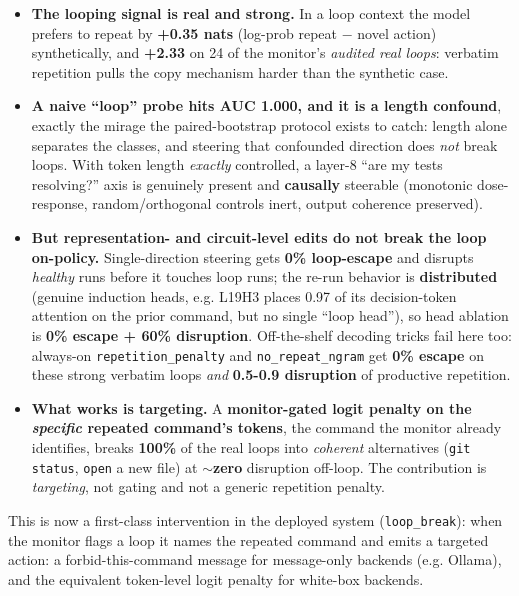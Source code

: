 \begin{itemize}
\item \textbf{The looping signal is real and strong.} In a loop context the model prefers to repeat by \textbf{+0.35 nats} (log-prob repeat $-$ novel action) synthetically, and \textbf{+2.33} on 24 of the monitor's \emph{audited real loops}: verbatim repetition pulls the copy mechanism harder than the synthetic case.
\item \textbf{A naive ``loop'' probe hits AUC 1.000, and it is a length confound}, exactly the mirage the paired-bootstrap protocol exists to catch: length alone separates the classes, and steering that confounded direction does \emph{not} break loops. With token length \emph{exactly} controlled, a layer-8 ``are my tests resolving?'' axis is genuinely present and \textbf{causally} steerable (monotonic dose-response, random/orthogonal controls inert, output coherence preserved).
\item \textbf{But representation- and circuit-level edits do not break the loop on-policy.} Single-direction steering gets \textbf{0\% loop-escape} and disrupts \emph{healthy} runs before it touches loop runs; the re-run behavior is \textbf{distributed} (genuine induction heads, e.g. L19H3 places 0.97 of its decision-token attention on the prior command, but no single ``loop head''), so head ablation is \textbf{0\% escape + 60\% disruption}. Off-the-shelf decoding tricks fail here too: always-on \texttt{repetition\_penalty} and \texttt{no\_repeat\_ngram} get \textbf{0\% escape} on these strong verbatim loops \emph{and} \textbf{0.5-0.9 disruption} of productive repetition.
\item \textbf{What works is targeting.} A \textbf{monitor-gated logit penalty on the \emph{specific} repeated command's tokens}, the command the monitor already identifies, breaks \textbf{100\%} of the real loops into \emph{coherent} alternatives (\texttt{git status}, \texttt{open} a new file) at \textbf{$\sim$zero} disruption off-loop. The contribution is \emph{targeting}, not gating and not a generic repetition penalty.
\end{itemize}
This is now a first-class intervention in the deployed system (\texttt{loop\_break}): when the monitor flags a loop it names the repeated command and emits a targeted action: a forbid-this-command message for message-only backends (e.g. Ollama), and the equivalent token-level logit penalty for white-box backends.

